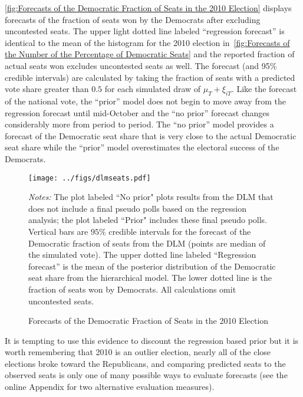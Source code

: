 \documentclass[12pt,final,fleqn]{article}
\theoremstyle{plain}
\begin{document}
\autoref{fig:Forecasts of the Democratic Fraction of Seats in the 2010 Election} displays forecasts of the fraction of seats won by the Democrats after excluding uncontested seats. The upper light dotted line labeled ``regression forecast'' is identical to the mean of the histogram for the 2010 election in~\autoref{fig:Forecasts of the Number of the Percentage of Democratic Seats} and the reported fraction of actual seats won excludes uncontested seats as well. The forecast (and 95\% credible intervals) are calculated by taking the fraction of seats with a predicted vote share greater than $0.5$ for each simulated draw of $\mu_T + \xi_{iT}$. Like the forecast of the national vote, the ``prior'' model does not begin to move away from the regression forecast until mid-October and the ``no prior'' forecast changes considerably more from period to period. The ``no prior'' model provides a forecast of the Democratic seat share that is very close to the actual Democratic seat share while the ``prior'' model overestimates the electoral success of the Democrats. 

\begin{figure}[!htb]
\centering
\texttt{[image: ../figs/dlmseats.pdf]}
\vspace{.5cm}
\caption{Forecasts of the Democratic Fraction of Seats in the 2010 Election}
\label{fig:Forecasts of the Democratic Fraction of Seats in the 2010 Election}
\begin{minipage}{\linewidth}
\footnotesize
\emph{Notes:} The plot labeled ``No prior" plots results from the DLM that does not include a final pseudo polls based on the regression analysis; the plot labeled ``Prior" includes these final pseudo polls. Vertical bars are $95\%$ credible intervals for the forecast of the Democratic fraction of seats from the DLM (points are median of the simulated vote). The upper dotted line labeled ``Regression forecast'' is the mean of the posterior distribution of the Democratic seat share from the hierarchical model. The lower dotted line is the fraction of seats won by Democrats. All calculations omit uncontested seats.
\end{minipage}
\end{figure}

It is tempting to use this evidence to discount the regression based prior but it is worth remembering that 2010 is an outlier election, nearly all of the close elections broke toward the Republicans, and comparing predicted seats to the observed seats is only one of many possible ways to evaluate forecasts (see the online Appendix for two alternative evaluation measures). 
\end{document}
